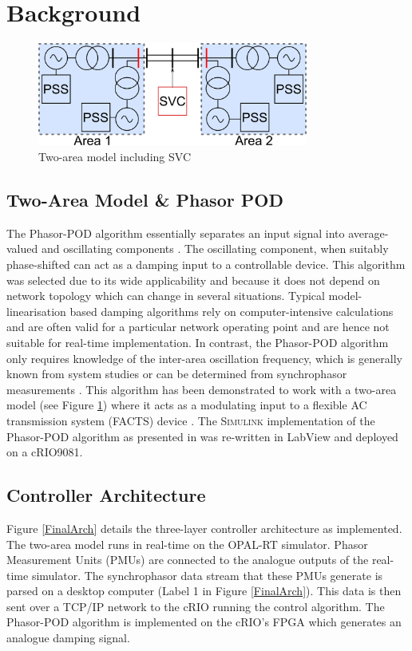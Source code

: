 \documentclass[conference]{IEEEtran}
\begin{document}
\section{Background}\label{background}

\begin{figure}[!h]
\centering
\includegraphics[width=3.5in]{TwoArea.png} 
\caption{Two-area model including SVC}
\label{TwoArea}
\end{figure}

\subsection{Two-Area Model \& Phasor POD}
The Phasor-POD algorithm essentially separates an input signal into average-valued and oscillating components \cite{PhasorPOD}. The oscillating component, when suitably phase-shifted can act as a damping input to a controllable device. This algorithm\cite{PhasorPOD} was selected due to its wide applicability and because it does not depend on network topology which can change in several situations. Typical model-linearisation based damping algorithms rely on computer-intensive calculations and are often valid for a particular network operating point and are hence not suitable for real-time implementation. In contrast, the Phasor-POD algorithm only requires knowledge of the inter-area oscillation frequency, which is generally known from system studies or can be determined from synchrophasor measurements \cite{TaskForce}. This algorithm has been demonstrated to work with a two-area model (see Figure \ref{TwoArea}) where it acts as a modulating input to a flexible AC transmission system (FACTS) device \cite{PhasorPODImplement}. The \textsc{Simulink} implementation of the Phasor-POD algorithm as presented in \cite{PhasorPODImplement} was re-written in LabView and deployed on a cRIO9081.

\subsection{Controller Architecture}
Figure \ref{FinalArch} details the three-layer controller architecture as implemented. The two-area model runs in real-time on the OPAL-RT simulator. Phasor Measurement Units (PMUs) are connected to the analogue outputs of the real-time simulator. The synchrophasor data stream that these PMUs generate is parsed on a desktop computer (Label 1 in Figure \ref{FinalArch}). This data is then sent over a TCP/IP network to the cRIO running the control algorithm. The Phasor-POD algorithm is implemented on the cRIO's FPGA which generates an analogue damping signal.
\end{document}
